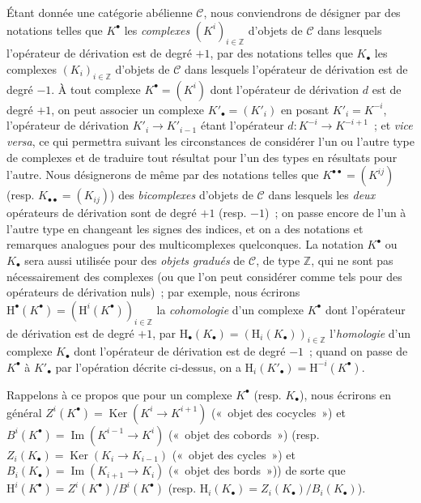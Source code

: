 \begin{env}[11.2.1]
\label{0.11.2.1-fr}
Étant donnée une catégorie abélienne $\mathcal C$, nous conviendrons de
désigner par des notations telles que $K^\bullet$ les \emph{complexes}
$(K^i)_{i\in\mathbb Z}$ d'objets de $\mathcal C$ dans lesquels l'opérateur de
dérivation est de degré $+1$, par des notations telles que $K_\bullet$ les
complexes $(K_i)_{i\in\mathbb Z}$ d'objets de $\mathcal C$ dans lesquels
l'opérateur de dérivation est de degré $-1$. À tout complexe
$K^\bullet=(K^i)$ dont l'opérateur de dérivation $d$ est de degré $+1$, on
peut associer un complexe $K'_\bullet=(K'_i)$ en posant $K'_i=K^{-i}$,
l'opérateur de dérivation $K'_i\to K'_{i-1}$ étant l'opérateur
$d:K^{-i}\to K^{-i+1}$~; et \emph{vice versa}, ce qui permettra suivant les
circonstances de considérer l'un ou l'autre type de complexes et de traduire
tout résultat pour l'un des types en résultats pour l'autre. Nous désignerons
de même par des notations telles que $K^{\bullet\bullet}=(K^{ij})$ (resp.
$K_{\bullet\bullet}=(K_{ij})$) des \emph{bicomplexes} d'objets de
$\mathcal C$ dans lesquels les \emph{deux} opérateurs de dérivation sont de
degré $+1$ (resp. $-1$)~; on passe encore de l'un à l'autre type en changeant
les signes des indices, et on a des notations et remarques analogues pour des
multicomplexes quelconques. La notation $K^\bullet$ ou $K_\bullet$ sera aussi
utilisée pour des \emph{objets gradués} de $\mathcal C$, de type $\mathbb Z$,
qui ne sont pas nécessairement des complexes (ou que l'on peut considérer
comme tels pour des opérateurs de dérivation nuls)~; par exemple, nous
écrirons
$\mathrm H^\bullet(K^\bullet)=(\mathrm H^i(K^\bullet))_{i\in\mathbb Z}$ la
\emph{cohomologie} d'un complexe $K^\bullet$ dont l'opérateur de dérivation
est de degré $+1$, par
$\mathrm H_\bullet(K_\bullet)=(\mathrm H_i(K_\bullet))_{i\in\mathbb Z}$
l'\emph{homologie} d'un complexe $K_\bullet$ dont l'opérateur de dérivation
est de degré $-1$~; quand on passe de $K^\bullet$ à $K'_\bullet$ par
l'opération décrite ci-dessus, on a
$\mathrm H_i(K'_\bullet)=\mathrm H^{-i}(K^\bullet)$.

Rappelons à ce propos que pour un complexe $K^\bullet$ (resp. $K_\bullet$),
nous écrirons en général
$Z^i(K^\bullet)=\operatorname{Ker}(K^i\to K^{i+1})$ («~objet des cocycles~»)
et $B^i(K^\bullet)=\operatorname{Im}(K^{i-1}\to K^i)$ («~objet des
cobords~») (resp.
$Z_i(K_\bullet)=\operatorname{Ker}(K_i\to K_{i-1})$ («~objet des cycles~»)
et $B_i(K_\bullet)=\operatorname{Im}(K_{i+1}\to K_i)$ («~objet des
bords~»)) de sorte que
$\mathrm H^i(K^\bullet)=Z^i(K^\bullet)/B^i(K^\bullet)$ (resp.
$\mathrm H_i(K_\bullet)=Z_i(K_\bullet)/B_i(K_\bullet)$).


\end{env}
